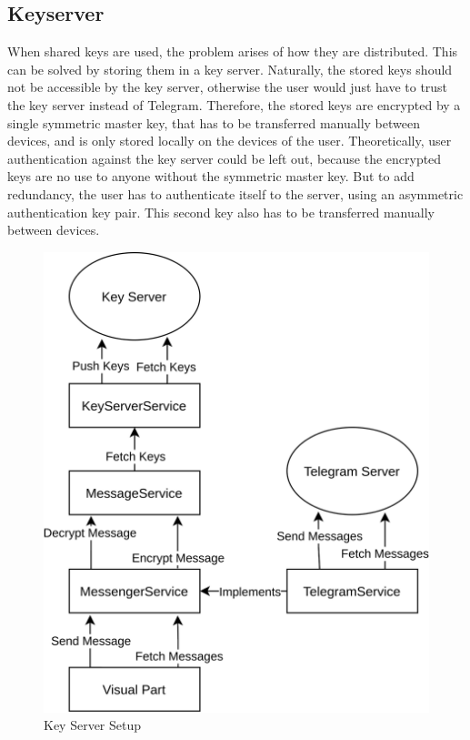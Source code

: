 \documentclass[a4paper, oneside]{discothesis}
\begin{document}
\subsection{Keyserver}

When shared keys are used, the problem arises of how they are distributed. This can be solved by storing them in a key server. Naturally, the stored keys should not be accessible by the key server, otherwise the user would just have to trust the key server instead of Telegram. Therefore, the stored keys are encrypted by a single symmetric master key, that has to be transferred manually between devices, and is only stored locally on the devices of the user. Theoretically, user authentication against the key server could be left out, because the encrypted keys are no use to anyone without the symmetric master key. But to add redundancy, the user has to authenticate itself to the server, using an asymmetric authentication key pair. This second key also has to be transferred manually between devices.


\begin{figure}[h!]
    \centering
    \includegraphics[width=\columnwidth]{figures/structure.png}
    \caption{Key Server Setup}
    \label{fig:structure}
\end{figure}
\end{document}
